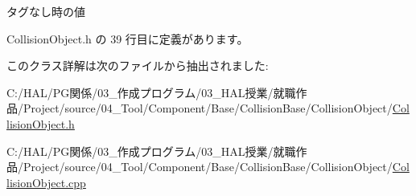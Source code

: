 タグなし時の値 



 Collision\+Object.\+h の 39 行目に定義があります。



このクラス詳解は次のファイルから抽出されました\+:\begin{DoxyCompactItemize}
\item 
C\+:/\+H\+A\+L/\+P\+G関係/03\+\_\+作成プログラム/03\+\_\+\+H\+A\+L授業/就職作品/\+Project/source/04\+\_\+\+Tool/\+Component/\+Base/\+Collision\+Base/\+Collision\+Object/\mbox{\hyperlink{_collision_object_8h}{Collision\+Object.\+h}}\item 
C\+:/\+H\+A\+L/\+P\+G関係/03\+\_\+作成プログラム/03\+\_\+\+H\+A\+L授業/就職作品/\+Project/source/04\+\_\+\+Tool/\+Component/\+Base/\+Collision\+Base/\+Collision\+Object/\mbox{\hyperlink{_collision_object_8cpp}{Collision\+Object.\+cpp}}\end{DoxyCompactItemize}
